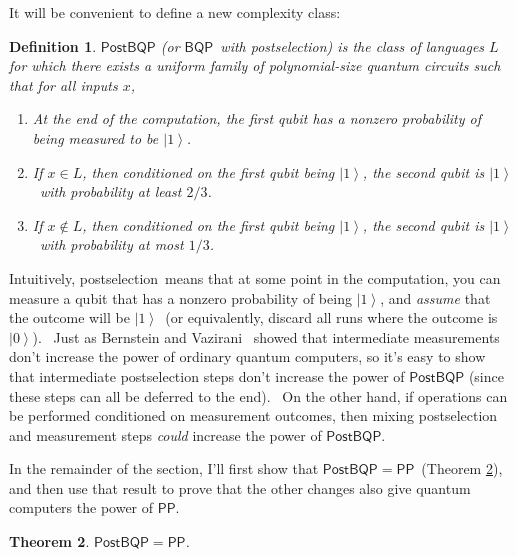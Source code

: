 \documentclass[12pt]{article}%
\newtheorem{theorem}{Theorem}
\newtheorem{definition}[theorem]{Definition}
\begin{document}
It will be convenient to define a new complexity class:

\begin{definition}
\label{postbqpdef}$\mathsf{PostBQP}$ (or $\mathsf{BQP}$\ with postselection)
is the class of languages $L$ for which there exists a uniform family of
polynomial-size quantum circuits such that for all inputs $x$,

\begin{enumerate}
\item[(i)] At the end of the computation, the first qubit has a nonzero
probability of being measured to be $\left\vert 1\right\rangle $.

\item[(ii)] If $x\in L$, then conditioned on the first qubit being $\left\vert
1\right\rangle $, the second qubit is $\left\vert 1\right\rangle $\ with
probability at least $2/3$.

\item[(iii)] If $x\notin L$, then conditioned on the first qubit being
$\left\vert 1\right\rangle $, the second qubit is $\left\vert 1\right\rangle
$\ with probability at most $1/3$.
\end{enumerate}
\end{definition}

Intuitively, postselection\ means that at some point in the computation, you
can measure a qubit that has a nonzero probability of being $\left\vert
1\right\rangle $, and \textit{assume} that the outcome will be $\left\vert
1\right\rangle $\ (or equivalently, discard all runs where the outcome is
$\left\vert 0\right\rangle $). \ Just as Bernstein and Vazirani \cite{bv}%
\ showed that intermediate measurements don't increase the power of ordinary
quantum computers, so it's easy to show that intermediate postselection steps
don't increase the power of $\mathsf{PostBQP}$ (since these steps can all be
deferred to the end). \ On the other hand, if operations can be performed
conditioned on measurement outcomes, then mixing postselection and measurement
steps \textit{could} increase the power of $\mathsf{PostBQP}$.

In the remainder of the section, I'll first show that $\mathsf{PostBQP}%
=\mathsf{PP}$\ (Theorem \ref{postbqppp}), and then use that result to prove
that the other changes also give quantum computers the power of $\mathsf{PP}$.

\begin{theorem}
\label{postbqppp}$\mathsf{PostBQP}=\mathsf{PP}$.
\end{theorem}
\end{document}
